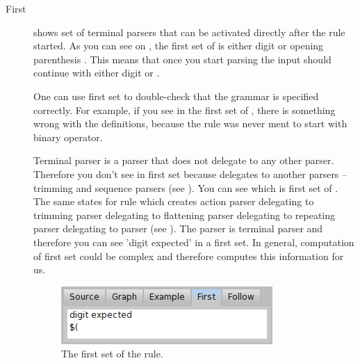 \documentclass[a4paper,10pt,twoside]{book}
\begin{document}
\begin{description}
\item[First] shows set of terminal parsers that can be activated directly 
    after the rule started.
  As you can see on , the first set of  is 
    either digit or opening parenthesis . 
  This means that once you start parsing  the input should continue 
    with either digit or .
  
  One can use first set to double-check that the grammar is specified correctly.
  For example, if you see  in the first set of , there is 
    something wrong with the definitions, because the  rule was never 
    ment to start with binary operator.
  
  Terminal parser is a parser that does not delegate to any other parser.
  Therefore you don't see  in  first set because 
    delegates to another parsers -- trimming and sequence parsers 
    (see ).
  You can see  which is first set of .
  The same states for  rule which creates action parser delegating to
    trimming parser delegating to flattening parser delegating to repeating parser 
    delegating to  parser
    (see ).
  The  parser is terminal parser and therefore you can see 
    'digit expected' in a first set.
  In general, computation of first set could be complex and therefore
     computes this information for us.

  \begin{figure}[ht]
    \begin{center}
      \includegraphics[width=.4\linewidth]{PPBrowserFirst}
      \caption{The first set of the 
        rule. \label{fig:pp/browserFirst}}
    \end{center}
  \end{figure}

  \begin{script}{ rule in  \label{scr:pp/expressionGrammarPrimAndParens}}
ExpressionGrammar>>prim
    ^ parens / number

ExpressionGrammar>>parens
    ^ $( asParser trim, term, $} asParser trim

ExpressionGrammar>>number
    ^ #digit asParser plus flatten trim ==> [:str | str asNumber ]
\end{script}



\end{description}
\end{document}
